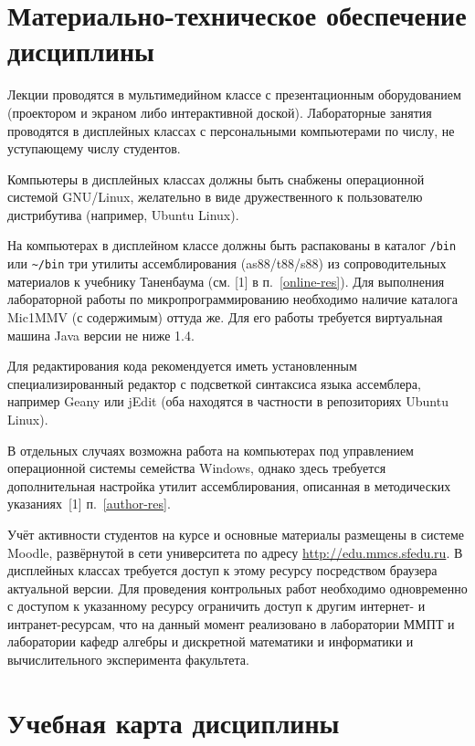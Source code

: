 \section{Материально-техническое обеспечение дисциплины}

Лекции проводятся в мультимедийном классе с презентационным оборудованием (проектором и экраном либо интерактивной доской). Лабораторные занятия проводятся в дисплейных классах с персональными компьютерами по числу, не уступающему числу студентов.


Компьютеры в дисплейных классах должны быть снабжены операционной системой GNU/Linux, желательно в виде дружественного к пользователю дистрибутива (например, Ubuntu Linux).

На компьютерах в дисплейном классе должны быть распакованы в каталог \texttt{/bin} или \texttt{\textasciitilde/bin} три утилиты ассемблирования (as88/t88/s88) из сопроводительных материалов к учебнику Таненбаума (см. [1] в п.~\ref{online-res}). Для выполнения лабораторной работы по микропрограммированию необходимо наличие каталога Mic1MMV (с содержимым) оттуда же. Для его работы требуется виртуальная машина Java версии не ниже 1.4.

Для редактирования кода рекомендуется иметь установленным специализированный редактор с подсветкой синтаксиса языка ассемблера, например Geany или jEdit (оба находятся в частности в репозиториях Ubuntu Linux).

В отдельных случаях возможна работа на компьютерах под управлением операционной системы семейства Windows, однако здесь требуется дополнительная настройка утилит ассемблирования, описанная в методических указаниях~[1] п.~\ref{author-res}.



Учёт активности студентов на курсе и основные материалы размещены в системе Moodle, развёрнутой в сети университета по адресу \url{http://edu.mmcs.sfedu.ru}. В дисплейных классах требуется доступ к этому ресурсу посредством браузера актуальной версии. Для проведения контрольных работ необходимо одновременно с доступом к указанному ресурсу ограничить доступ к другим интернет- и интранет-ресурсам, что на данный момент реализовано в лаборатории ММПТ и лаборатории кафедр алгебры и дискретной математики и информатики и вычислительного эксперимента факультета.

\clearpage
\section{Учебная карта дисциплины}

% 
% 


